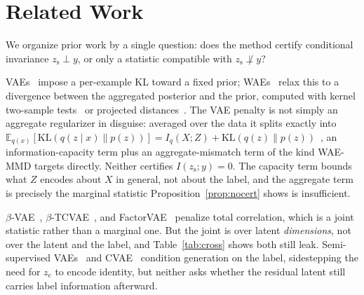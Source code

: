 \documentclass[letterpaper]{article} %
\newcommand{\zc}{z_{\mathrm{c}}}
\newcommand{\zs}{z_{\mathrm{s}}}
\newcommand{\KL}{\mathrm{KL}}
\begin{document}
\section{Related Work}

We organize prior work by a single question: does the method certify
conditional invariance $\zs\perp y$, or only a statistic compatible with
$\zs\not\perp y$?

VAEs~\citep{kingma2013autoencoding} impose a per-example KL toward a fixed
prior; WAEs~\citep{tolstikhin2017wasserstein} relax this to a divergence
between the aggregated posterior and the prior, computed with kernel
two-sample tests~\citep{gretton2012kernel} or projected
distances~\citep{kolouri2018sliced}. The VAE penalty is not simply an
aggregate regularizer in disguise: averaged over the data it splits exactly
into $\mathbb E_{q(x)}[\KL(q(z\mid x)\|p(z))] = I_q(X;Z) +
\KL(q(z)\|p(z))$~\citep{hoffman2016elbo}, an information-capacity term plus
an aggregate-mismatch term of the kind WAE-MMD targets directly. Neither
certifies $I(\zs;y)=0$. The capacity term bounds what $Z$ encodes about $X$
in general, not about the label, and the aggregate term is precisely the
marginal statistic Proposition~\ref{prop:nocert} shows is insufficient.

$\beta$-VAE~\citep{higgins2017beta}, $\beta$-TCVAE~\citep{chen2018isolating},
and FactorVAE~\citep{kim2018disentangling} penalize total correlation, which
is a joint statistic rather than a marginal one. But the joint is over latent
\emph{dimensions}, not over the latent and the label, and
Table~\ref{tab:cross} shows both still leak. Semi-supervised
VAEs~\citep{kingma2014semi} and CVAE~\citep{sohn2015learning} condition
generation on the label, sidestepping the need for $\zc$ to encode identity,
but neither asks whether the residual latent still carries label information
afterward.
\end{document}
